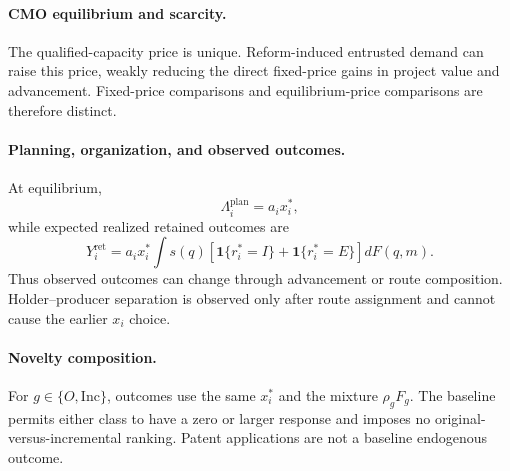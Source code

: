 \documentclass[11pt]{article}
\begin{document}
\paragraph{CMO equilibrium and scarcity.}
The qualified-capacity price is unique. Reform-induced entrusted demand can
raise this price, weakly reducing the direct fixed-price gains in project
value and advancement. Fixed-price comparisons and equilibrium-price
comparisons are therefore distinct.

\paragraph{Planning, organization, and observed outcomes.}
At equilibrium,
\[
  \Lambda_i^{\mathrm{plan}}=a_ix_i^*,
\]
while expected realized retained outcomes are
\begin{equation}
  Y_i^{\mathrm{ret}}
  =
  a_ix_i^*
  \int s(q)
  \left[
  \mathbf 1\{r_i^*=I\}
  +
  \mathbf 1\{r_i^*=E\}
  \right]dF(q,m).
  \label{eq:p16m-retained-outcome}
\end{equation}
Thus observed outcomes can change through advancement or route composition.
Holder--producer separation is observed only after route assignment and
cannot cause the earlier \(x_i\) choice.

\paragraph{Novelty composition.}
For \(g\in\{O,\mathrm{Inc}\}\), outcomes use the same \(x_i^*\) and the
mixture \(\rho_gF_g\). The baseline permits either class to have a zero or
larger response and imposes no original-versus-incremental ranking. Patent
applications are not a baseline endogenous outcome.
\end{document}
